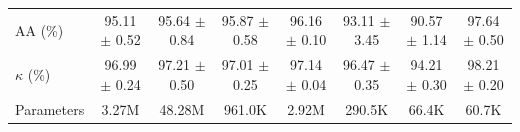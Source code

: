 \begin{table}[htbp]
{\begin{tabular}{l c c c c c c c}
    AA (\%) & 95.11 $\pm$ 0.52 & 95.64 $\pm$ 0.84 & \textcolor{tgred}{95.87 $\pm$ 0.58} & \textcolor{tgblue}{96.16 $\pm$ 0.10} & 93.11 $\pm$ 3.45 & 90.57 $\pm$ 1.14 & \textcolor{tgteal}{97.64 $\pm$ 0.50} \\
    $\kappa$ (\%) & 96.99 $\pm$ 0.24 & \textcolor{tgblue}{97.21 $\pm$ 0.50} & 97.01 $\pm$ 0.25 & \textcolor{tgred}{97.14 $\pm$ 0.04} & 96.47 $\pm$ 0.35 & 94.21 $\pm$ 0.30 & \textcolor{tgteal}{98.21 $\pm$ 0.20} \\
    \midrule
    Parameters & 3.27M & 48.28M & 961.0K & 2.92M & 290.5K & 66.4K & 60.7K \\
    \bottomrule
  \end{tabular}%
  }
\end{table}
